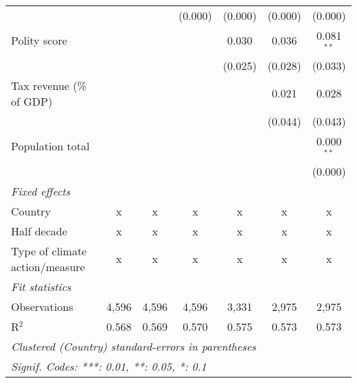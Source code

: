 \begin{tabular}{lcccccc}
                                                                                &         &                & (0.000)        & (0.000)        & (0.000)        & (0.000)\\   
   Polity score                                                                 &         &                &                & 0.030          & 0.036          & 0.081$^{**}$\\   
                                                                                &         &                &                & (0.025)        & (0.028)        & (0.033)\\   
   Tax revenue (\% of GDP)                                                      &         &                &                &                & 0.021          & 0.028\\   
                                                                                &         &                &                &                & (0.044)        & (0.043)\\   
   Population total                                                             &         &                &                &                &                & 0.000$^{**}$\\   
                                                                                &         &                &                &                &                & (0.000)\\   
   \emph{Fixed effects}\\
   Country                                                                      & x       & x              & x              & x              & x              & x\\  
   Half decade                                                                  & x       & x              & x              & x              & x              & x\\  
   Type of climate action/measure                                               & x       & x              & x              & x              & x              & x\\  
   \midrule \emph{Fit statistics}\\
   Observations                                                                 & 4,596   & 4,596          & 4,596          & 3,331          & 2,975          & 2,975\\  
   R$^2$                                                                        & 0.568   & 0.569          & 0.570          & 0.575          & 0.573          & 0.573\\  
   \midrule
   \multicolumn{7}{l}{\emph{Clustered (Country) standard-errors in parentheses}}\\
   \multicolumn{7}{l}{\emph{Signif. Codes: ***: 0.01, **: 0.05, *: 0.1}}\\
\end{tabular}
\par\endgroup


